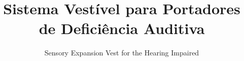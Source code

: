 \documentclass{sig-alternate-05-2015}
\begin{document}





%

\title{Sistema Vestível para Portadores de Deficiência Auditiva}
\subtitle{Sensory Expansion Vest for the Hearing Impaired}
%
%
%
%
%
\end{document}
